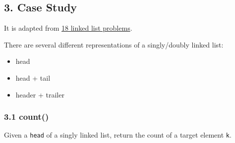 \documentclass[aspectratio=169, 14pt]{beamer}
\begin{document}
\begin{frame}
	\section{\textcolor{darkmidnightblue}{3. Case Study}}
	It is adapted from \href{http://cslibrary.stanford.edu/105/LinkedListProblems.pdf}{18 linked list problems}.
\end{frame}

{
\begin{frame}[standout]
	There are several different representations of a singly/doubly linked list:
	\begin{itemize}
		\item head
		\item head + tail
		\item header + trailer
	\end{itemize}
\end{frame}
}

\begin{frame}
	\frametitle{3.1 count()}
	Given a \alert{\texttt{head}} of a singly linked list, return the count of a target element \texttt{k}.

	\pause
\end{frame}
\end{document}
